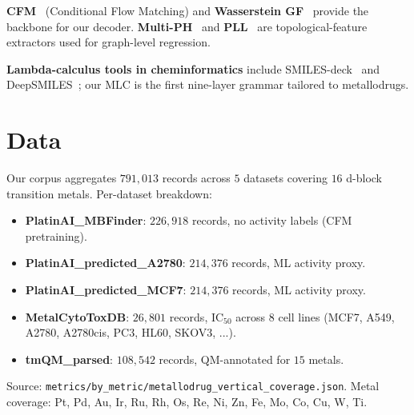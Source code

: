 \documentclass[10pt]{article}
\begin{document}
\textbf{CFM}~\cite{cfm2023} (Conditional Flow Matching) and
\textbf{Wasserstein GF}~\cite{wgf2022} provide the backbone for our
decoder.  \textbf{Multi-PH}~\cite{multiph2021} and
\textbf{PLL}~\cite{pll2020} are topological-feature extractors used for
graph-level regression.

\textbf{Lambda-calculus tools in cheminformatics} include
SMILES-deck~\cite{smilesdeck2018} and DeepSMILES~\cite{deepsmiles2019};
our MLC is the first nine-layer grammar tailored to metallodrugs.





\section{Data}
\label{sec:data}

Our corpus aggregates $791{,}013$ records across $5$ datasets covering
$16$ d-block transition metals.  Per-dataset breakdown:

\begin{itemize}
  \item \textbf{PlatinAI\_MBFinder}: $226{,}918$ records, no activity
        labels (CFM pretraining).
  \item \textbf{PlatinAI\_predicted\_A2780}: $214{,}376$ records, ML
        activity proxy.
  \item \textbf{PlatinAI\_predicted\_MCF7}: $214{,}376$ records, ML
        activity proxy.
  \item \textbf{MetalCytoToxDB}: $26{,}801$ records, IC$_{50}$ across $8$
        cell lines (MCF7, A549, A2780, A2780cis, PC3, HL60, SKOV3, ...).
  \item \textbf{tmQM\_parsed}: $108{,}542$ records, QM-annotated for $15$
        metals.
\end{itemize}

\noindent Source: \texttt{metrics/by\_metric/metallodrug\_vertical\_coverage.json}.
Metal coverage: Pt, Pd, Au, Ir, Ru, Rh, Os, Re, Ni, Zn, Fe, Mo, Co, Cu, W, Ti.
\end{document}
